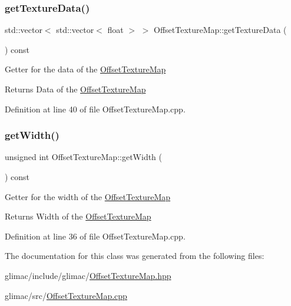 \mbox{\label{class_offset_texture_map_a6bbac444751f0796e88bd98548fa5682}} 
\subsubsection{\texorpdfstring{get\+Texture\+Data()}{getTextureData()}}
{\footnotesize\ttfamily std\+::vector$<$ std\+::vector$<$ float $>$ $>$ Offset\+Texture\+Map\+::get\+Texture\+Data (\begin{DoxyParamCaption}{ }\end{DoxyParamCaption}) const}

Getter for the data of the \hyperlink{class_offset_texture_map}{Offset\+Texture\+Map} \begin{DoxyReturn}{Returns}
Data of the \hyperlink{class_offset_texture_map}{Offset\+Texture\+Map} 
\end{DoxyReturn}


Definition at line 40 of file Offset\+Texture\+Map.\+cpp.

\mbox{\label{class_offset_texture_map_af96d09140f305cebb8e39fabcef79d63}} 
\subsubsection{\texorpdfstring{get\+Width()}{getWidth()}}
{\footnotesize\ttfamily unsigned int Offset\+Texture\+Map\+::get\+Width (\begin{DoxyParamCaption}{ }\end{DoxyParamCaption}) const}

Getter for the width of the \hyperlink{class_offset_texture_map}{Offset\+Texture\+Map} \begin{DoxyReturn}{Returns}
Width of the \hyperlink{class_offset_texture_map}{Offset\+Texture\+Map} 
\end{DoxyReturn}


Definition at line 36 of file Offset\+Texture\+Map.\+cpp.



The documentation for this class was generated from the following files\+:\begin{DoxyCompactItemize}
\item 
glimac/include/glimac/\hyperlink{_offset_texture_map_8hpp}{Offset\+Texture\+Map.\+hpp}\item 
glimac/src/\hyperlink{_offset_texture_map_8cpp}{Offset\+Texture\+Map.\+cpp}\end{DoxyCompactItemize}

